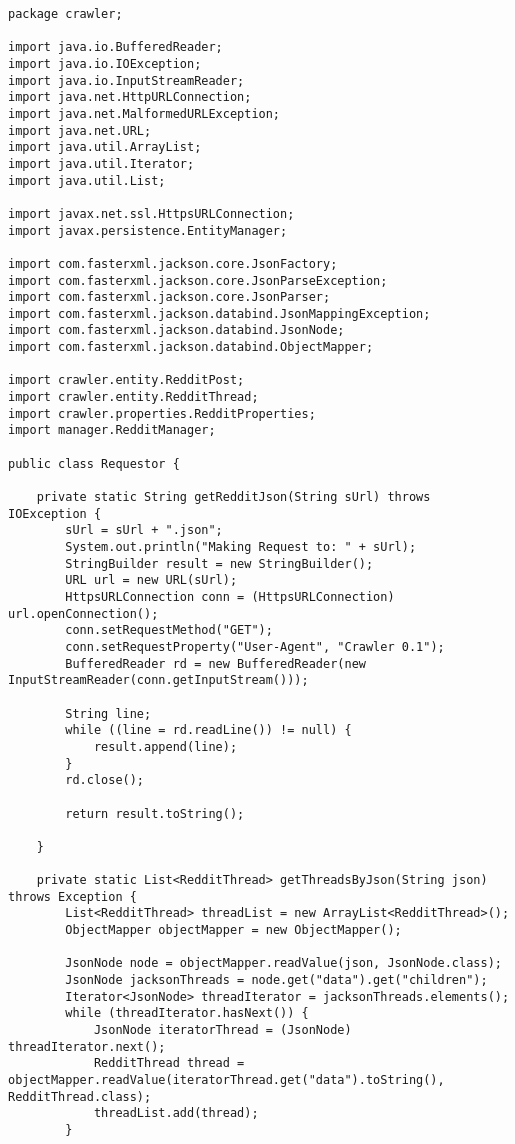 \begin{lstlisting}
package crawler;

import java.io.BufferedReader;
import java.io.IOException;
import java.io.InputStreamReader;
import java.net.HttpURLConnection;
import java.net.MalformedURLException;
import java.net.URL;
import java.util.ArrayList;
import java.util.Iterator;
import java.util.List;

import javax.net.ssl.HttpsURLConnection;
import javax.persistence.EntityManager;

import com.fasterxml.jackson.core.JsonFactory;
import com.fasterxml.jackson.core.JsonParseException;
import com.fasterxml.jackson.core.JsonParser;
import com.fasterxml.jackson.databind.JsonMappingException;
import com.fasterxml.jackson.databind.JsonNode;
import com.fasterxml.jackson.databind.ObjectMapper;

import crawler.entity.RedditPost;
import crawler.entity.RedditThread;
import crawler.properties.RedditProperties;
import manager.RedditManager;

public class Requestor {

	private static String getRedditJson(String sUrl) throws IOException {
		sUrl = sUrl + ".json";
		System.out.println("Making Request to: " + sUrl);
		StringBuilder result = new StringBuilder();
		URL url = new URL(sUrl);
		HttpsURLConnection conn = (HttpsURLConnection) url.openConnection();
		conn.setRequestMethod("GET");
		conn.setRequestProperty("User-Agent", "Crawler 0.1");
		BufferedReader rd = new BufferedReader(new InputStreamReader(conn.getInputStream()));

		String line;
		while ((line = rd.readLine()) != null) {
			result.append(line);
		}
		rd.close();

		return result.toString();

	}

	private static List<RedditThread> getThreadsByJson(String json) throws Exception {
		List<RedditThread> threadList = new ArrayList<RedditThread>();
		ObjectMapper objectMapper = new ObjectMapper();

		JsonNode node = objectMapper.readValue(json, JsonNode.class);
		JsonNode jacksonThreads = node.get("data").get("children");
		Iterator<JsonNode> threadIterator = jacksonThreads.elements();
		while (threadIterator.hasNext()) {
			JsonNode iteratorThread = (JsonNode) threadIterator.next();
			RedditThread thread = objectMapper.readValue(iteratorThread.get("data").toString(), RedditThread.class);
			threadList.add(thread);
		}


\end{lstlisting}

